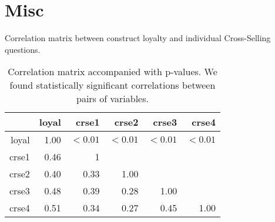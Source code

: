 \documentclass[10pt,a4paper]{article}
\begin{document}
\section*{Misc}
Correlation matrix between construct loyalty and individual Cross-Selling questions.
\begin{table}[ht]
\centering
\begin{tabular}{rrrrrr}
  \hline
 & loyal & crse1 & crse2 & crse3 & crse4 \\ 
  \hline
loyal & 1.00 & $<0.01$ & $<0.01$ & $<0.01$ & $<0.01$ \\ 
  crse1 & 0.46 & 1 &  &  &  \\ 
  crse2 & 0.40 & 0.33 & 1.00 &  &  \\ 
  crse3 & 0.48 & 0.39 & 0.28 & 1.00 &  \\ 
  crse4 & 0.51 & 0.34 & 0.27 & 0.45 & 1.00 \\ 
   \hline
\end{tabular}
\caption{Correlation matrix accompanied with p-values. We found statistically significant correlations between pairs of variables.}
\end{table}
\end{document}
